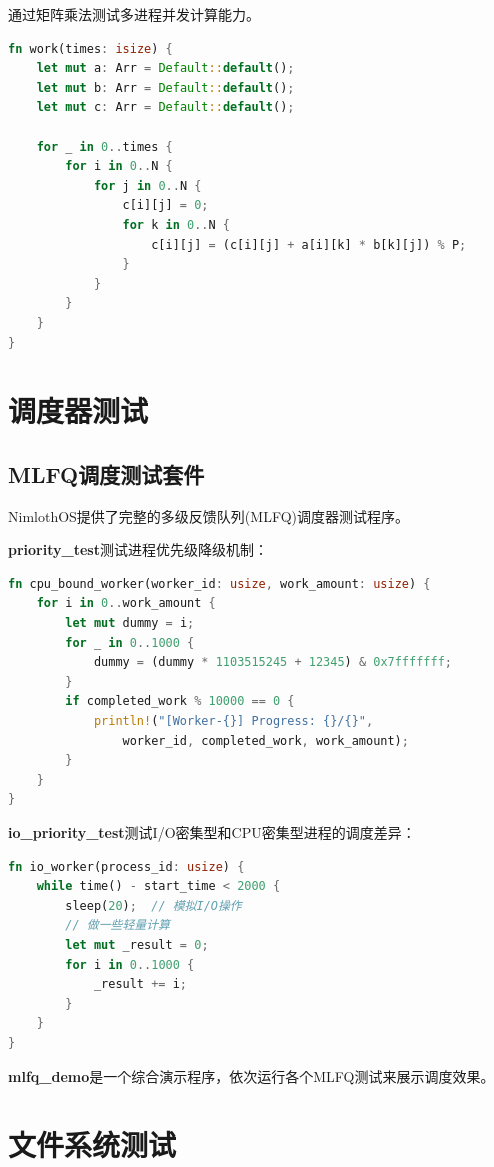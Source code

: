 通过矩阵乘法测试多进程并发计算能力。

\begin{lstlisting}[language=Rust]
fn work(times: isize) {
    let mut a: Arr = Default::default();
    let mut b: Arr = Default::default();
    let mut c: Arr = Default::default();
    
    for _ in 0..times {
        for i in 0..N {
            for j in 0..N {
                c[i][j] = 0;
                for k in 0..N {
                    c[i][j] = (c[i][j] + a[i][k] * b[k][j]) % P;
                }
            }
        }
    }
}
\end{lstlisting}

\section{调度器测试}

\subsection{MLFQ调度测试套件}

NimlothOS提供了完整的多级反馈队列(MLFQ)调度器测试程序。

\textbf{priority\_test}测试进程优先级降级机制：

\begin{lstlisting}[language=Rust]
fn cpu_bound_worker(worker_id: usize, work_amount: usize) {
    for i in 0..work_amount {
        let mut dummy = i;
        for _ in 0..1000 {
            dummy = (dummy * 1103515245 + 12345) & 0x7fffffff;
        }
        if completed_work % 10000 == 0 {
            println!("[Worker-{}] Progress: {}/{}",
                worker_id, completed_work, work_amount);
        }
    }
}
\end{lstlisting}

\textbf{io\_priority\_test}测试I/O密集型和CPU密集型进程的调度差异：

\begin{lstlisting}[language=Rust]
fn io_worker(process_id: usize) {
    while time() - start_time < 2000 {
        sleep(20);  // 模拟I/O操作
        // 做一些轻量计算
        let mut _result = 0;
        for i in 0..1000 {
            _result += i;
        }
    }
}
\end{lstlisting}

\textbf{mlfq\_demo}是一个综合演示程序，依次运行各个MLFQ测试来展示调度效果。

\section{文件系统测试}

